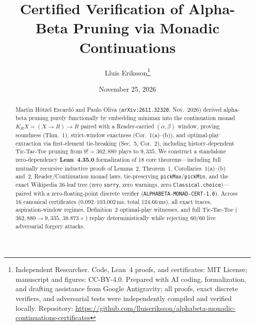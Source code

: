 \documentclass[10pt,twocolumn]{article}
\title{\vspace{-1.1em}\textbf{Certified Verification of Alpha-Beta Pruning via Monadic Continuations}}
\author{Lluis Eriksson\thanks{Independent Researcher. Code, Lean~4 proofs, and certificates: MIT License; manuscript and figures: CC-BY-4.0. Prepared with AI coding, formalization, and drafting assistance from Google Antigravity; all proofs, exact discrete verifiers, and adversarial tests were independently compiled and verified locally. Repository: \url{https://github.com/lluiseriksson/alphabeta-monadic-continuations-certificates}}}
\date{November 25, 2026}
\begin{document}
\maketitle
\vspace{-1.4em}

\begin{abstract}
Mart{\'\i}n H{\"o}tzel Escard{\'o} and Paulo Oliva (\texttt{arXiv:2611.32320}, Nov.\ 2026) derived alpha-beta pruning purely functionally by embedding minimax into the continuation monad $K_R X = (X \to R) \to R$ paired with a Reader-carried $(\alpha,\beta)$ window, proving soundness (Thm.~1), strict-window exactness (Cor.~1(a)--(b)), and optimal-play extraction via first-element tie-breaking (Sec.~5, Cor.~2), including history-dependent Tic-Tac-Toe pruning from $9! = 362{,}880$ plays to $9{,}335$. We construct a standalone zero-dependency \textbf{Lean~4.35.0} formalization of 18 core theorems---including full mutually recursive inductive proofs of Lemma~2, Theorem~1, Corollaries~1(a)--(b) and~2, Reader/Continuation monad laws, tie-preserving \texttt{pickMax}/\texttt{pickMin}, and the exact Wikipedia 36-leaf tree (zero \texttt{sorry}, zero warnings, zero \texttt{Classical.choice})---paired with a zero-floating-point discrete verifier (\texttt{ALPHABETA-MONAD-CERT-1.0}). Across 16 canonical certificates ($0.092$--$103.002\,\mathrm{ms}$, total $124.66\,\mathrm{ms}$), all exact traces, aspiration-window regimes, Definition~2 optimal-play witnesses, and full Tic-Tac-Toe ($362{,}880 \to 9{,}335$, $38.873\times$) replay deterministically while rejecting 60/60 live adversarial forgery attacks.
\end{abstract}
\end{document}
